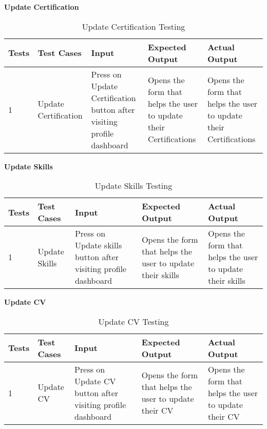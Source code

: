 \textbf{Update Certification}\\
\begin{table}[H]
    \caption{Update Certification Testing}
        \label{}
    \begin{tabular}{|p{0.3in}|p{1.3in}|p{1.3in}|p{1.3in}|p{1in}|}
        \hline
        Tests & Test Cases & Input &Expected Output & Actual Output \\
        \hline
            1 &Update Certification & Press on Update Certification button after visiting profile dashboard &Opens the form that helps the user to update their Certifications  &Opens the form that helps the user to update their Certifications  \\
            \hline
\end{tabular}
\end{table}

\textbf{Update Skills}\\
\begin{table}[H]
    \caption{Update Skills Testing}
        \label{}
    \begin{tabular}{|p{0.3in}|p{1.3in}|p{1.3in}|p{1.3in}|p{1in}|}
        \hline
        Tests & Test Cases & Input &Expected Output & Actual Output \\
        \hline
            1 &Update Skills & Press on Update skills button after visiting profile dashboard &Opens the form that helps the user to update their skills  &Opens the form that helps the user to update their skills  \\
            \hline
\end{tabular}
\end{table}

\textbf{Update CV}\\
\begin{table}[H]
    \caption{Update CV Testing}
        \label{}
    \begin{tabular}{|p{0.3in}|p{1.3in}|p{1.3in}|p{1.3in}|p{1in}|}
        \hline
        Tests & Test Cases & Input &Expected Output & Actual Output \\
        \hline
            1 &Update CV & Press on Update CV button after visiting profile dashboard &Opens the form that helps the user to update their CV  &Opens the form that helps the user to update their CV  \\
            \hline
\end{tabular}
\end{table}

